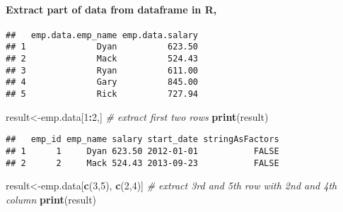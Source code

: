 \documentclass[
]{article}
\newenvironment{Shaded}{\begin{snugshade}}{\end{snugshade}}
\newcommand{\CommentTok}[1]{\textcolor[rgb]{0.56,0.35,0.01}{\textit{#1}}}
\newcommand{\DecValTok}[1]{\textcolor[rgb]{0.00,0.00,0.81}{#1}}
\newcommand{\FunctionTok}[1]{\textcolor[rgb]{0.13,0.29,0.53}{\textbf{#1}}}
\newcommand{\NormalTok}[1]{#1}
\newcommand{\OtherTok}[1]{\textcolor[rgb]{0.56,0.35,0.01}{#1}}
\newcommand{\SpecialCharTok}[1]{\textcolor[rgb]{0.81,0.36,0.00}{\textbf{#1}}}
\begin{document}
\paragraph{Extract part of data from dataframe in
R,}\label{extract-part-of-data-from-dataframe-in-r}

\begin{Shaded}
\end{Shaded}

\begin{verbatim}
##   emp.data.emp_name emp.data.salary
## 1              Dyan          623.50
## 2              Mack          524.43
## 3              Ryan          611.00
## 4              Gary          845.00
## 5              Rick          727.94
\end{verbatim}

\begin{Shaded}
\begin{Highlighting}[]
\NormalTok{result}\OtherTok{\textless{}{-}}\NormalTok{emp.data[}\DecValTok{1}\SpecialCharTok{:}\DecValTok{2}\NormalTok{,] }\CommentTok{\# extract first two rows}
\FunctionTok{print}\NormalTok{(result)}
\end{Highlighting}
\end{Shaded}

\begin{verbatim}
##   emp_id emp_name salary start_date stringAsFactors
## 1      1     Dyan 623.50 2012-01-01           FALSE
## 2      2     Mack 524.43 2013-09-23           FALSE
\end{verbatim}

\begin{Shaded}
\begin{Highlighting}[]
\NormalTok{result}\OtherTok{\textless{}{-}}\NormalTok{emp.data[}\FunctionTok{c}\NormalTok{(}\DecValTok{3}\NormalTok{,}\DecValTok{5}\NormalTok{), }\FunctionTok{c}\NormalTok{(}\DecValTok{2}\NormalTok{,}\DecValTok{4}\NormalTok{)] }\CommentTok{\# extract 3rd and 5th row with 2nd and 4th column}
\FunctionTok{print}\NormalTok{(result)}
\end{Highlighting}
\end{Shaded}
\end{document}
